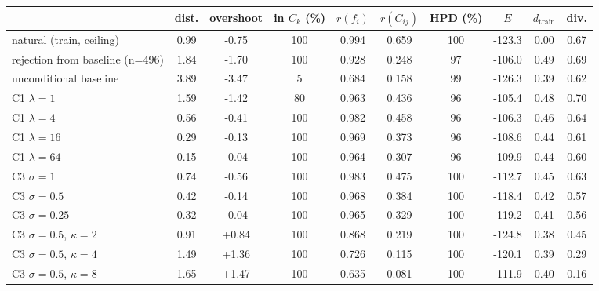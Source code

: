 \begin{tabular}{lccccccccc}
\toprule
 & dist. & overshoot & in $C_k$ (\%) & $r(f_i)$ & $r(C_{ij})$ & HPD (\%) & $E$ & $d_\text{train}$ & div. \\
\midrule
natural (train, ceiling) & 0.99 & -0.75 & 100 & 0.994 & 0.659 & 100 & -123.3 & 0.00 & 0.67 \\
rejection from baseline (n=496) & 1.84 & -1.70 & 100 & 0.928 & 0.248 & 97 & -106.0 & 0.49 & 0.69 \\
unconditional baseline & 3.89 & -3.47 & 5 & 0.684 & 0.158 & 99 & -126.3 & 0.39 & 0.62 \\
\midrule
C1 $\lambda{=}1$ & 1.59 & -1.42 & 80 & 0.963 & 0.436 & 96 & -105.4 & 0.48 & 0.70 \\
C1 $\lambda{=}4$ & 0.56 & -0.41 & 100 & 0.982 & 0.458 & 96 & -106.3 & 0.46 & 0.64 \\
C1 $\lambda{=}16$ & 0.29 & -0.13 & 100 & 0.969 & 0.373 & 96 & -108.6 & 0.44 & 0.61 \\
C1 $\lambda{=}64$ & 0.15 & -0.04 & 100 & 0.964 & 0.307 & 96 & -109.9 & 0.44 & 0.60 \\
\midrule
C3 $\sigma{=}1$ & 0.74 & -0.56 & 100 & 0.983 & 0.475 & 100 & -112.7 & 0.45 & 0.63 \\
C3 $\sigma{=}0.5$ & 0.42 & -0.14 & 100 & 0.968 & 0.384 & 100 & -118.4 & 0.42 & 0.57 \\
C3 $\sigma{=}0.25$ & 0.32 & -0.04 & 100 & 0.965 & 0.329 & 100 & -119.2 & 0.41 & 0.56 \\
C3 $\sigma{=}0.5$, $\kappa{=}2$ & 0.91 & +0.84 & 100 & 0.868 & 0.219 & 100 & -124.8 & 0.38 & 0.45 \\
C3 $\sigma{=}0.5$, $\kappa{=}4$ & 1.49 & +1.36 & 100 & 0.726 & 0.115 & 100 & -120.1 & 0.39 & 0.29 \\
C3 $\sigma{=}0.5$, $\kappa{=}8$ & 1.65 & +1.47 & 100 & 0.635 & 0.081 & 100 & -111.9 & 0.40 & 0.16 \\
\bottomrule
\end{tabular}
